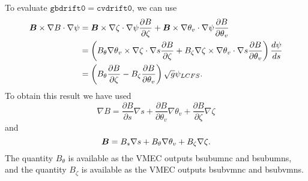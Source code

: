 \documentclass[11pt,letter]{article}
\newcommand{\vect}[1]{\mbox{\boldmath $#1$}}
\newcommand{\gbdriftO}{\mathtt{gbdrift0}}
\newcommand{\cvdriftO}{\mathtt{cvdrift0}}
\begin{document}
To evaluate $\gbdriftO = \cvdriftO$, we can use
\begin{align}
\vect{B}\times\nabla B\cdot\nabla\psi 
&= 
\vect{B}\times\nabla \zeta \cdot \nabla \psi \frac{\partial B}{\partial \zeta} + \vect{B}\times\nabla \theta_v \cdot \nabla \psi \frac{\partial B}{\partial \theta_v} \nonumber \\
&=  \left(
B_\theta \nabla\theta_v \times\nabla\zeta\cdot\nabla s \frac{\partial B}{\partial\zeta} + B_\zeta \nabla\zeta\times\nabla\theta_v\cdot\nabla s \frac{\partial B}{\partial\theta_v} \right) \frac{d\psi}{ds} \nonumber \\
&= \left( B_\theta \frac{\partial B}{\partial\zeta} - B_\zeta \frac{\partial B}{\partial\theta_v} \right) \sqrt{g} \psi_{LCFS} .
\end{align}
To obtain this result we have used
\begin{equation}
\nabla B = \frac{\partial B}{\partial s} \nabla s + \frac{\partial B}{\partial\theta_v} \nabla\theta_v + \frac{\partial B}{\partial\zeta} \nabla\zeta
\label{eq:gradB}
\end{equation}
and
\begin{equation}
\vect{B} = B_s \nabla s + B_\theta \nabla \theta_v + B_\zeta \nabla\zeta.
\label{eq:Bsub}
\end{equation}
The quantity $B_\theta$ is available as the VMEC outputs {\ttfamily bsubumnc} and {\ttfamily bsubumns},
and the quantity $B_\zeta$ is available as the VMEC outputs {\ttfamily bsubvmnc} and {\ttfamily bsubvmns}.
\end{document}
